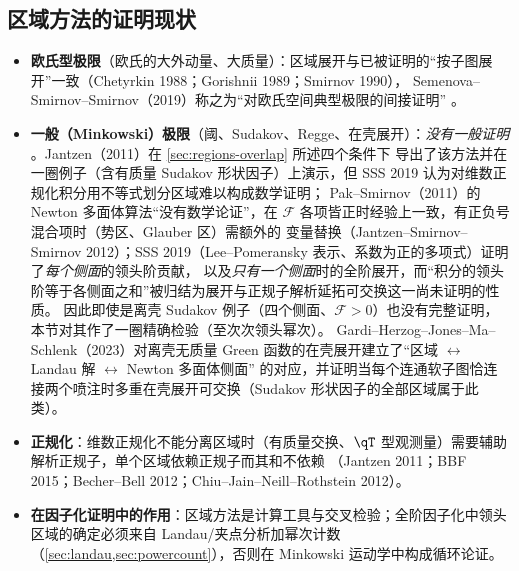 \subsection{区域方法的证明现状}

\begin{itemize}[leftmargin=2em]
\item \textbf{欧氏型极限}（欧氏的大外动量、大质量）：区域展开与已被证明的“按子图展开”一致（Chetyrkin 1988；Gorishnii 1989；Smirnov 1990），
  Semenova--Smirnov--Smirnov（2019）称之为“对欧氏空间典型极限的间接证明” \tagR。
\item \textbf{一般（Minkowski）极限}（阈、Sudakov、Regge、在壳展开）：\emph{没有一般证明} \tagP。Jantzen（2011）在 \cref{sec:regions-overlap} 所述四个条件下
  导出了该方法并在一圈例子（含有质量 Sudakov 形状因子）上演示，但 SSS 2019 认为对维数正规化积分用不等式划分区域难以构成数学证明；
  Pak--Smirnov（2011）的 Newton 多面体算法“没有数学论证”，在 $\mathcal F$ 各项皆正时经验上一致，有正负号混合项时（势区、Glauber 区）需额外的
  变量替换（Jantzen--Smirnov--Smirnov 2012）；SSS 2019（Lee--Pomeransky 表示、系数为正的多项式）证明了\emph{每个侧面}的领头阶贡献，
  以及\emph{只有一个侧面}时的全阶展开，而“积分的领头阶等于各侧面之和”被归结为展开与正规子解析延拓可交换这一尚未证明的性质。
  因此即使是离壳 Sudakov 例子（四个侧面、$\mathcal F>0$）也没有完整证明，本节对其作了一圈精确检验（至次次领头幂次）。
  Gardi--Herzog--Jones--Ma--Schlenk（2023）对离壳无质量 Green 函数的在壳展开建立了“区域 $\leftrightarrow$ Landau 解 $\leftrightarrow$ Newton 多面体侧面”
  的对应，并证明当每个连通软子图恰连接两个喷注时多重在壳展开可交换（Sudakov 形状因子的全部区域属于此类）。
\item \textbf{正规化}：维数正规化不能分离区域时（有质量交换、$\qT$ 型观测量）需要辅助解析正规子，单个区域依赖正规子而其和不依赖
  （Jantzen 2011；BBF 2015；Becher--Bell 2012；Chiu--Jain--Neill--Rothstein 2012）。
\item \textbf{在因子化证明中的作用}：区域方法是计算工具与交叉检验；全阶因子化中领头区域的确定必须来自 Landau/夹点分析加幂次计数
  （\cref{sec:landau,sec:powercount}），否则在 Minkowski 运动学中构成循环论证。
\end{itemize}
